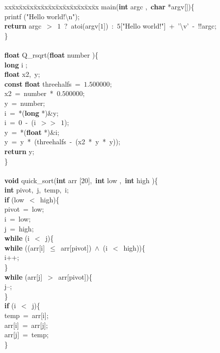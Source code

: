 \begin{tabbing}xx\=xx\=xx\=xx\=xx\=xx\=xx\=xx\=xx\=xx\=xx\=xx\=xx  main({\bf int} argc ,\ {\bf char}  *argv[])\{\+\\
printf ("Hello world!\textbackslash n");\\
{\bf return} argc\ $>$\ $1$\ ?\ atoi(argv[$1$])\ :\ $5$["Hello world!"]\ +\ '\textbackslash v'\ -\ !!argc;\\
\<\}\-\\
\\
{\bf float}  Q\_rsqrt({\bf float} number )\{\+\\
{\bf long} i ;\\
{\bf float}  x2,\ y;\\
{\bf const} {\bf float}  threehalfs\ =\ $1.500000$;\\
 x2\ =\ number\ *\ $0.500000$;\\
 y\ =\ number;\\
 i\ =\ *({\bf long} *)\&y;\\
 i\ =\ $0$\ -\ (i\ $>>$\ $1$);\\
 y\ =\ *({\bf float} *)\&i;\\
 y\ =\ y\ *\ (threehalfs\ -\ (x2\ *\ y\ *\ y));\\
{\bf return} y;\\
\<\}\-\\
\\
{\bf void}  quick\_sort({\bf int} arr [$20$],\ {\bf int} low ,\ {\bf int} high )\{\+\\
{\bf int}  pivot,\ j,\ temp,\ i;\\
{\bf if} (low\ $<$\ high)\{\+\\
 pivot\ =\ low;\\
 i\ =\ low;\\
 j\ =\ high;\\
{\bf while} (i\ $<$\ j)\{\+\\
{\bf while} ((arr[i]\ $\leq$\ arr[pivot])\ $\wedge$\ (i\ $<$\ high))\{\+\\
 i++;\\
\<\}\-\\
{\bf while} (arr[j]\ $>$\ arr[pivot])\{\+\\
 j--;\\
\<\}\-\\
{\bf if} (i\ $<$\ j)\{\+\\
 temp\ =\ arr[i];\\
 arr[i]\ =\ arr[j];\\
 arr[j]\ =\ temp;\\
\<\}\-\\

\end{tabbing}
